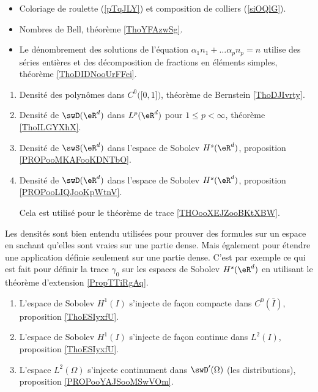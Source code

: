 \begin{itemize}
    \item Coloriage de roulette (\ref{pTqJLY}) et composition de colliers (\ref{siOQlG}).
    \item Nombres de Bell, théorème \ref{ThoYFAzwSg}.
    \item Le dénombrement des solutions de l'équation \( \alpha_1 n_1+\ldots \alpha_pn_p=n\) utilise des séries entières et des décomposition de fractions en éléments simples, théorème \ref{ThoDIDNooUrFFei}.
\end{itemize}

\begin{enumerate}
    \item 
        Densité des polynômes dans \( C^0\big( \mathopen[ 0 , 1 \mathclose] \big)\), théorème de Bernstein \ref{ThoDJIvrty}.
    \item
        Densité de \( \swD(\eR^d)\) dans \( L^p(\eR^d)\) pour \( 1\leq p<\infty\), théorème \ref{ThoILGYXhX}.
    \item
        Densité de \( \swS(\eR^d)\) dans l'espace de Sobolev \( H^s(\eR^d)\), proposition \ref{PROPooMKAFooKDNTbO}. 

    \item
        Densité de \( \swD(\eR^d)\) dans l'espace de Sobolev \( H^s(\eR^d)\), proposition \ref{PROPooLIQJooKpWtnV}. 

        Cela est utilisé pour le théorème de trace \ref{THOooXEJZooBKtXBW}.
\end{enumerate}
Les densités sont bien entendu utilisées pour prouver des formules sur un espace en sachant qu'elles sont vraies sur une partie dense. Mais également pour étendre une application définie seulement sur une partie dense. C'est par exemple ce qui est fait pour définir la trace \( \gamma_0\) sur les espaces de Sobolev \( H^s(\eR^d)\) en utilisant le théorème d'extension \ref{PropTTiRgAq}.

\begin{enumerate}
        \item
            L'espace de Sobolev \( H^1(I)\) s'injecte de façon compacte dans \( C^0(\bar I)\), proposition \ref{ThoESIyxfU}.
        \item
            L'espace de Sobolev \( H^1(I)\) s'injecte de façon continue dans \( L^2(I)\), proposition \ref{ThoESIyxfU}.
        \item
            L'espace \( L^2(\Omega)\) s'injecte continument dans \( \swD'(\Omega)\) (les distributions), proposition \ref{PROPooYAJSooMSwVOm}.
\end{enumerate}

